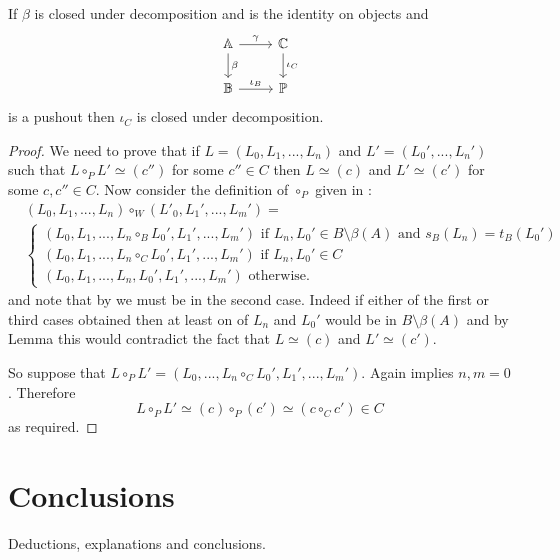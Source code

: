 \documentclass{article}
\begin{document}
\begin{proposition}\label{pushout-closed-under-decomposition}
	If $\beta$ is closed under decomposition and is the identity on objects and
	\begin{equation*}
		\begin{tikzcd}
			\mathbb{A} \dar{\beta} \rar{\gamma} & \mathbb{C} \dar{\iota_C}\\
			\mathbb{B} \rar{\iota_B} & \mathbb{P}
		\end{tikzcd}
	\end{equation*}
	is a pushout then $\iota_C$ is closed under decomposition.
	\begin{proof}
		We need to prove that if $L=(L_0,L_1,...,L_n)$ and $L'=(L_0',...,L_n')$ such that $L\circ_P L'\simeq (c'')$ for some $c''\in C$ then $L\simeq (c)$ and $L'\simeq (c')$ for some $c,c''\in C$.
		Now consider the definition of $\circ_P$ given in :
		\begin{align*}
		&(L_0,L_1,...,L_n)\circ_W (L'_0,L_1',...,L_m')=\\
	 	&\begin{cases}
	 		(L_0,L_1,...,L_n\circ_B L_0',L_1',...,L_m') \text{ if $L_n,L_0'\in B\setminus \beta(A)$ and $s_B(L_n)=t_B(L_0')$}\\
	 		(L_0,L_1,...,L_n\circ_C L_0',L_1',...,L_m') \text{ if $L_n,L_0'\in C$}\\
	 		(L_0,L_1,...,L_n,L_0',L_1',...,L_m') \text{ otherwise.}
	 	\end{cases}
	 \end{align*}
	 and note that by  we must be in the second case.
	 Indeed if either of the first or third cases obtained then at least on of $L_n$ and $L_0'$ would be in $B\setminus\beta(A)$ and by Lemma  this would contradict the fact that $L\simeq (c)$ and $L'\simeq (c')$.

	 So suppose that $L\circ_P L' = (L_0,...,L_n\circ_C L_0',L_1',...,L_m')$.
	 Again  implies $n,m=0$.
	 Therefore
	 $$L\circ_P L'\simeq (c)\circ_P (c')\simeq (c\circ_C c')\in C$$
	 as required.
	\end{proof}
\end{proposition}

\section{Conclusions}

Deductions, explanations and conclusions.



\end{document}
